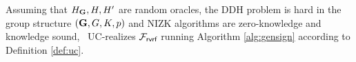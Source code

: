 
\begin{theorem}
	Assuming that $ H_{\mathbf{G}}, H,H' $ are random oracles,  the DDH problem is hard in the group structure $ ({\mathbf{G}}, G,K, p) $ and NIZK algorithms are zero-knowledge and knowledge sound, \name \ UC-realizes $\mathcal{F}_{\textsf{rvrf}}$ running Algorithm \ref{alg:gensign} according to Definition \ref{def:uc}.
\end{theorem}

